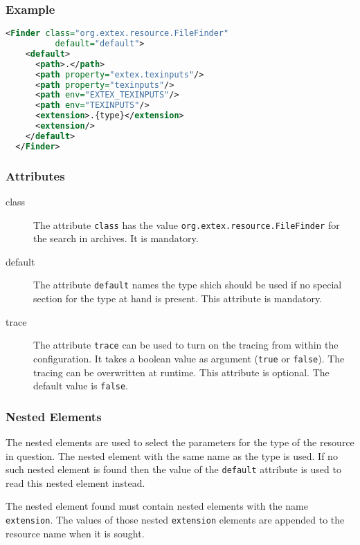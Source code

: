 \subsubsection*{Example}

\begin{lstlisting}[language=XML]
  <Finder class="org.extex.resource.FileFinder"
          default="default">
    <default>
      <path>.</path>
      <path property="extex.texinputs"/>
      <path property="texinputs"/>
      <path env="EXTEX_TEXINPUTS"/>
      <path env="TEXINPUTS"/>
      <extension>.{type}</extension>
      <extension/>
    </default>
  </Finder>
\end{lstlisting}

\subsubsection*{Attributes}
\begin{description}
\item[class] The attribute \texttt{class} has the value
  \texttt{org.extex.resource.FileFinder} for the search in
  archives. It is mandatory.
\item[default] The attribute \texttt{default} names the type shich
  should be used if no special section for the type at hand is
  present. This attribute is mandatory.
\item[trace] The attribute \texttt{trace} can be used to turn on the
  tracing from within the configuration. It takes a boolean value as
  argument (\texttt{true} or \texttt{false}). The tracing can be
  overwritten at runtime. This attribute is optional. The default
  value is \texttt{false}.
\end{description}

\subsubsection*{Nested Elements}

The nested elements are used to select the parameters for the type of
the resource in question. The nested element with the same name as the
type is used. If no such nested element is found then the value of the
\texttt{default} attribute is used to read this nested element
instead. 

The nested element found must contain nested elements with the name
\texttt{extension}. The values of those nested \texttt{extension}
elements are appended to the resource name when it is sought.

